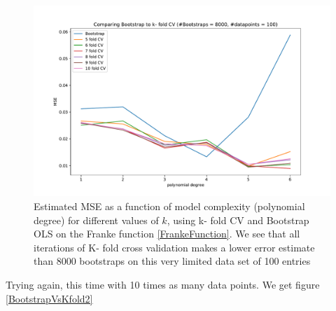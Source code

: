 \documentclass[11pt,a4paper,titlepage]{article}
\begin{document}
\begin{figure}[H]
\centering

\includegraphics[trim=1.4cm 0.2cm 2.5cm 1.2cm, clip=true,scale = 0.5]{KfoldVsBootstrap_k5to10_8kBootstraps.pdf}
\caption[Comparing Error estimates from Bootstrap vs. K- fold CV]{Estimated MSE as a function of model complexity (polynomial degree) for different values of $k$, using k- fold CV and Bootstrap OLS on the Franke function \eqref{FrankeFunction}. We see that all iterations of K- fold cross validation makes a lower error estimate than 8000 bootstraps on this very limited data set of 100 entries}\label{BootstrapVsKfold1}
\end{figure}
Trying again, this time with 10 times as many data points. We get figure \ref{BootstrapVsKfold2}
\end{document}
